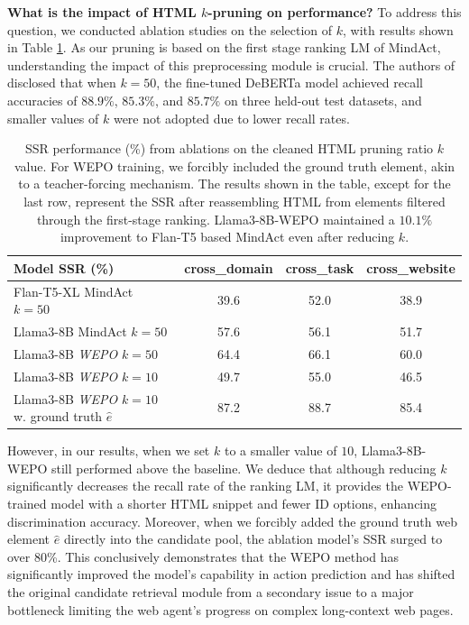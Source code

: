 \documentclass{article}
\begin{document}
  \textbf{What is the impact of HTML $k$-pruning on performance?} To address this question, we conducted ablation studies on the selection of $k$, with results shown in Table \ref{tab:k_ablation}. As our pruning is based on the first stage ranking LM of MindAct, understanding the impact of this preprocessing module is crucial. The authors of \citet{deng2024mind2web} disclosed that when $k=50$, the fine-tuned DeBERTa \citep{he2020deberta} model achieved recall accuracies of $88.9\%$, $85.3\%$, and $85.7\%$ on three held-out test datasets, and smaller values of $k$ were not adopted due to lower recall rates. 

  \begin{table}
    \centering
    \begin{tabular}{l|c|c|c}
      \toprule
      \textbf{Model} SSR (\%) & \textbf{cross\_domain} & \textbf{cross\_task} & \textbf{cross\_website} \\
      \midrule
      Flan-T5-XL MindAct $k=50$ & 39.6 & 52.0 & 38.9 \\
      Llama3-8B MindAct $k=50$ & 57.6 & 56.1 & 51.7 \\
      Llama3-8B \textit{WEPO} $k=50$ & 64.4 & 66.1 & 60.0 \\
      Llama3-8B \textit{WEPO} $k=10$ & 49.7 & 55.0 & 46.5 \\
      \midrule
      Llama3-8B \textit{WEPO} $k=10$ w. ground truth $\hat{e}$ & 87.2 & 88.7 & 85.4 \\
      \bottomrule
    \end{tabular}
    \caption{\label{tab:k_ablation}
      SSR performance (\%) from ablations on the cleaned HTML pruning ratio $k$ value. For WEPO training, we forcibly included the ground truth element, akin to a teacher-forcing mechanism. The results shown in the table, except for the last row, represent the SSR after reassembling HTML from elements filtered through the first-stage ranking. Llama3-8B-WEPO maintained a $10.1\%$ improvement to Flan-T5 based MindAct even after reducing $k$.
    }
  \end{table}
  
  However, in our results, when we set $k$ to a smaller value of $10$, Llama3-8B-WEPO still performed above the baseline. We deduce that although reducing $k$ significantly decreases the recall rate of the ranking LM, it provides the WEPO-trained model with a shorter HTML snippet and fewer ID options, enhancing discrimination accuracy. Moreover, when we forcibly added the ground truth web element $\hat{e}$ directly into the candidate pool, the ablation model's SSR surged to over 80\%. This conclusively demonstrates that the WEPO method has significantly improved the model's capability in action prediction and has shifted the original candidate retrieval module from a secondary issue to a major bottleneck limiting the web agent's progress on complex long-context web pages.
  
\end{document}
